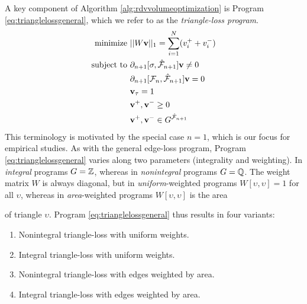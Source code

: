 A key component of Algorithm \ref{alg:rdvvolumeoptimization} is Program \eqref{eq:trianglelossgeneral}, which we refer to as the \emph{triangle-loss program}.
\begin{align}
\begin{split}
 \text{minimize } & ||W \mathbf{v} ||_1 = \sum_{i=1}^N (v_i^+ + v_i^-)  \\
\text{subject to } &  \partial_{n+1}[ \sigma , \hat {\mathcal{F}}_{n+1} ] \mathbf{v} \neq 0     \\
&  \partial_{n+1}[\mathcal{F}_n, \hat {\mathcal{F}}_{n+1} ] \mathbf{v} = 0 \\
 & \mathbf{v}_{\tau} = 1\\
     & \mathbf{v}^+, \mathbf{v}^- \ge 0 \\
& \mathbf{v}^+, \mathbf{v}^- \in G^{ \hat {\mathcal{F}}_{n+1}}
\end{split}
\label{eq:trianglelossgeneral}
\end{align} 
This terminology is motivated by the special case $n=1$, which is our focus for  empirical studies.  As with the general edge-loss program, Program \eqref{eq:trianglelossgeneral} varies along two  parameters (integrality and weighting).  In \emph{integral} programs $G = \mathbb{Z}$, whereas in \emph{nonintegral} programs $G = \mathbb{Q}$.  The weight matrix $W$ is always diagonal, but in \emph{uniform}-weighted programs $W[\upsilon, \upsilon] = 1$ for all $\upsilon$, whereas in \emph{area}-weighted programs $W[\upsilon, \upsilon]$ is the area \DIFdelbegin %

\DIFdelend of triangle $\upsilon$.  Program \eqref{eq:trianglelossgeneral} thus results in four variants:

 
\begin{enumerate}[style=multiline]
    \item[\namedlabel{itm:tri_NIU}{$\Tri\NI\unif$}] Nonintegral triangle-loss with uniform weights.
    \item[\namedlabel{itm:tri_IU}{$\Tri\I\unif$}] Integral triangle-loss with uniform weights.
    \item[\namedlabel{itm:tri_NIA}{$\Tri\NI\area$}] Nonintegral triangle-loss with edges weighted by area.
    \item[\namedlabel{itm:tri_IA}{$\Tri\I\area$}] Integral triangle-loss with edges weighted by area. 
\end{enumerate}



